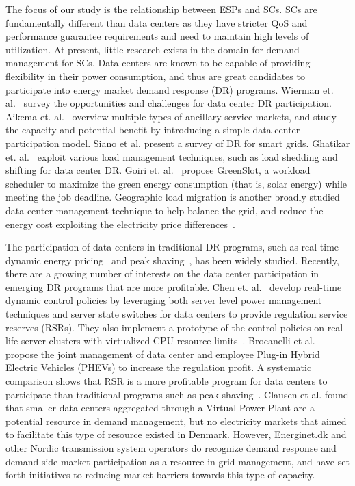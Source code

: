 The focus of our study is the relationship between ESPs and SCs. SCs are fundamentally different than data centers as they have stricter QoS and performance guarantee requirements and need to maintain high levels of utilization. At present, little research exists in the domain for demand management for SCs.  Data centers are known to be capable of providing flexibility in their power consumption, and thus are great candidates to participate into energy market demand response (DR) programs. Wierman et. al.~\cite{WiermanIGCC} survey the opportunities and challenges for data center DR participation. Aikema et. al.~\cite{aikema2012data} overview multiple types of ancillary service markets, and study the capacity and potential benefit by introducing a simple data center participation model. Siano et al. \cite{siano2014demand} present a survey of DR for smart grids. Ghatikar et. al.~\cite{ghatikar2012demand} exploit various load management techniques, such as load shedding and shifting for data center DR. Goiri et. al.~\cite{goiri2015matching} propose GreenSlot, a workload scheduler to maximize the green energy consumption (that is, solar energy) while meeting the job deadline. Geographic load migration is another broadly studied data center management technique to help balance the grid, and reduce the energy cost exploiting the electricity price differences~\cite{wangexploring,wang2013data,chiu2012electric,liu2011greening,lin2012online}.

The participation of data centers in traditional DR programs, such as real-time dynamic energy pricing~\cite{wang2013sequential,ghamkhari2012data,liu2014pricing} and peak shaving~\cite{urgaonkar2011optimal,PSUSigmetrics12,aksanli2013architecting}, has been widely studied. Recently, there are a growing number of interests on the data center participation in emerging DR programs that are more profitable. Chen et. al.~\cite{chenASPDAC} develop real-time dynamic control policies by leveraging both server level power management techniques and server state switches for data centers to provide regulation service reserves (RSRs). They also implement a prototype of the control policies on real-life server clusters with virtualized CPU resource limits~\cite{chendynamic}. Brocanelli et al.~\cite{brocanelli2013joint} propose the joint management of data center and employee Plug-in Hybrid Electric Vehicles (PHEVs) to increase the regulation profit. A systematic comparison shows that RSR is a more profitable program for data centers to participate than traditional programs such as peak shaving~\cite{chenIGCC}. Clausen et al. \cite{clausen2014load} found that smaller data centers aggregated through a Virtual Power Plant are a potential resource in demand management, but no electricity markets that aimed to facilitate this type of resource existed in Denmark. However, Energinet.dk and other Nordic transmission system operators do recognize demand response and demand-side market participation as a resource in grid management, and have set forth initiatives to reducing market barriers towards this type of capacity.  

